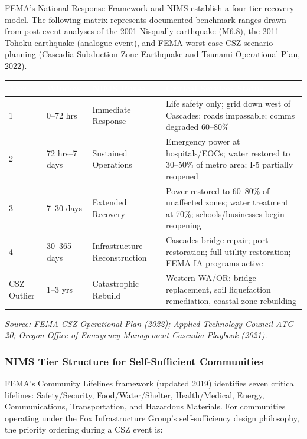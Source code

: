 \documentclass[11pt,letterpaper]{article}
\newcommand{\tableheader}[1]{\textbf{\sffamily\textcolor{white}{#1}}}
\begin{document}
FEMA's National Response Framework and NIMS establish a four-tier recovery model. The following matrix represents documented benchmark ranges drawn from post-event analyses of the 2001 Nisqually earthquake (M6.8), the 2011 Tohoku earthquake (analogue event), and FEMA worst-case CSZ scenario planning (Cascadia Subduction Zone Earthquake and Tsunami Operational Plan, 2022).

\begin{center}
\begin{tabularx}{\textwidth}{C{1.8cm}L{2.5cm}L{3cm}X}
\toprule
{}
\tableheader{Tier} & \tableheader{Window} & \tableheader{NIMS Phase} & \tableheader{Critical Services Status} \\
 & 0--72 hrs & Immediate Response & Life safety only; grid down west of Cascades; roads impassable; comms degraded 60--80\% \\
2 & 72 hrs--7 days & Sustained Operations & Emergency power at hospitals/EOCs; water restored to 30--50\% of metro area; I-5 partially reopened \\
3 & 7--30 days & Extended Recovery & Power restored to 60--80\% of unaffected zones; water treatment at 70\%; schools/businesses begin reopening \\
4 & 30--365 days & Infrastructure Reconstruction & Cascades bridge repair; port restoration; full utility restoration; FEMA IA programs active \\
CSZ Outlier & 1--3 yrs & Catastrophic Rebuild & Western WA/OR: bridge replacement, soil liquefaction remediation, coastal zone rebuilding \\
\bottomrule
\end{tabularx}
\end{center}

\textit{Source: FEMA CSZ Operational Plan (2022); Applied Technology Council ATC-20; Oregon Office of Emergency Management Cascadia Playbook (2021).}

\subsubsection{NIMS Tier Structure for Self-Sufficient Communities}

FEMA's Community Lifelines framework (updated 2019) identifies seven critical lifelines: Safety/Security, Food/Water/Shelter, Health/Medical, Energy, Communications, Transportation, and Hazardous Materials. For communities operating under the Fox Infrastructure Group's self-sufficiency design philosophy, the priority ordering during a CSZ event is:
\end{document}
